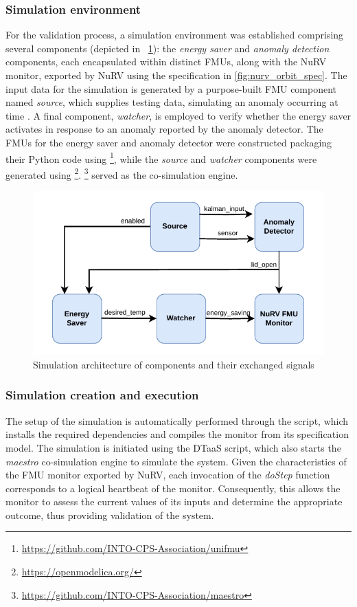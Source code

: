 \subsubsection{Simulation environment}
For the validation process, a simulation environment was established
comprising several components (depicted in ~\cref{fig:nurv_fmi_simulation}): the \textit{energy saver} and \textit{anomaly detection} components, each encapsulated within distinct FMUs, along with the NuRV monitor, exported by NuRV using the specification in \cref{fig:nurv_orbit_spec}. The input data for the simulation is generated by a purpose-built FMU component named \textit{source}, which supplies testing data, simulating an anomaly occurring at time . A final component, \textit{watcher}, is employed to verify whether the energy saver activates in response to an anomaly reported by the anomaly detector. The FMUs for the energy saver and anomaly detector were constructed packaging their Python code using \footnote{\url{https://github.com/INTO-CPS-Association/unifmu}}, while the \textit{source} and \textit{watcher} components were generated using \footnote{\url{https://openmodelica.org/}}. \footnote{\url{https://github.com/INTO-CPS-Association/maestro}} served as the co-simulation engine.%
%
\begin{figure}[ht]
	\centering
	\includegraphics[width=\columnwidth]{images/FMI-communication.pdf}
	\caption{Simulation architecture of components and their exchanged signals}
	\label{fig:nurv_fmi_simulation}
\end{figure}%
%
\subsubsection{Simulation creation and execution}
The setup of the simulation is automatically performed through the  script, which installs the required dependencies and compiles the monitor from its specification model. The simulation is initiated using the DTaaS  script, which also starts the \textit{maestro} co-simulation engine to simulate the system. Given the characteristics of the FMU monitor exported by NuRV, each invocation of the \textit{doStep} function corresponds to a logical heartbeat of the monitor. Consequently, this allows the monitor to assess the current values of its inputs and determine the appropriate outcome, thus providing validation of the system.


